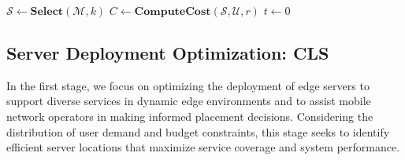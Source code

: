 \documentclass[10pt, conference, letterpaper]{IEEEtran}
\begin{document}
\addtolength{\topmargin}{0.06in}
\begin{algorithm}[!t]
    \caption{Coverage-based Local Search (CLS)}
    \label{algo:local_search}
    $\mathcal{S} \leftarrow \textbf{Select}(\mathcal{M},k)$\;
    $C \leftarrow \textbf{ComputeCost}(\mathcal{S}, \mathcal{U}, r)$\;
    $t \leftarrow 0$\;


\end{algorithm}

\subsection{Server Deployment Optimization: CLS}
In the first stage, we focus on optimizing the deployment of edge servers to support diverse services in dynamic edge environments and to assist mobile network operators in making informed placement decisions. Considering the distribution of user demand and budget constraints, this stage seeks to identify efficient server locations that maximize service coverage and system performance. 
\end{document}

